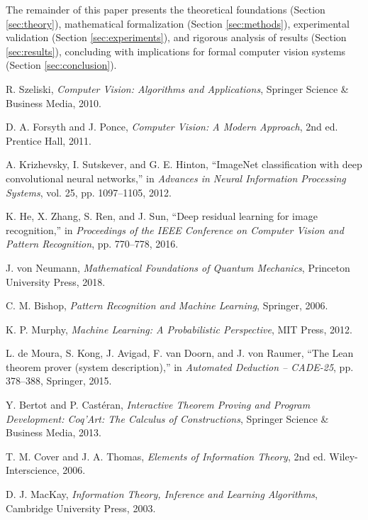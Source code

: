 The remainder of this paper presents the theoretical foundations (Section \ref{sec:theory}), mathematical formalization (Section \ref{sec:methods}), experimental validation (Section \ref{sec:experiments}), and rigorous analysis of results (Section \ref{sec:results}), concluding with implications for formal computer vision systems (Section \ref{sec:conclusion}).

\begin{thebibliography}{99}

R. Szeliski, \textit{Computer Vision: Algorithms and Applications}, Springer Science \& Business Media, 2010.

D. A. Forsyth and J. Ponce, \textit{Computer Vision: A Modern Approach}, 2nd ed. Prentice Hall, 2011.

A. Krizhevsky, I. Sutskever, and G. E. Hinton, ``ImageNet classification with deep convolutional neural networks,'' in \textit{Advances in Neural Information Processing Systems}, vol. 25, pp. 1097--1105, 2012.

K. He, X. Zhang, S. Ren, and J. Sun, ``Deep residual learning for image recognition,'' in \textit{Proceedings of the IEEE Conference on Computer Vision and Pattern Recognition}, pp. 770--778, 2016.

J. von Neumann, \textit{Mathematical Foundations of Quantum Mechanics}, Princeton University Press, 2018.

C. M. Bishop, \textit{Pattern Recognition and Machine Learning}, Springer, 2006.

K. P. Murphy, \textit{Machine Learning: A Probabilistic Perspective}, MIT Press, 2012.

L. de Moura, S. Kong, J. Avigad, F. van Doorn, and J. von Raumer, ``The Lean theorem prover (system description),'' in \textit{Automated Deduction -- CADE-25}, pp. 378--388, Springer, 2015.

Y. Bertot and P. Castéran, \textit{Interactive Theorem Proving and Program Development: Coq'Art: The Calculus of Constructions}, Springer Science \& Business Media, 2013.

T. M. Cover and J. A. Thomas, \textit{Elements of Information Theory}, 2nd ed. Wiley-Interscience, 2006.

D. J. MacKay, \textit{Information Theory, Inference and Learning Algorithms}, Cambridge University Press, 2003.


\end{thebibliography}
